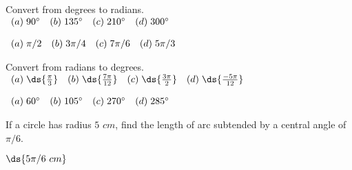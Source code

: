 \begin{enumialphparenastyle}


\begin{multicols}{2}
\begin{ex}
Convert from degrees to radians.\\
$\begin{array}{cccc}
(a) \hspace{1mm} 90^{\circ} & (b) \hspace{1mm} 135^{\circ} & (c) \hspace{1mm} 210^{\circ} & (d) \hspace{1mm} 300^{\circ} 
\end{array}$  
\begin{sol}
$\begin{array}{cccc}
	(a) \hspace{1mm} \pi/2 & (b) \hspace{1mm} 3\pi/4 & (c) \hspace{1mm} 7\pi/6 & (d) \hspace{1mm} 5\pi/3 
\end{array}$  
\end{sol}
\end{ex}

\begin{ex}
	Convert from radians to degrees.\\
	$\begin{array}{cccc}
	(a) \hspace{1mm} \ds{\frac{\pi}{3}} & (b) \hspace{1mm} \ds{\frac{7\pi}{12}} & (c) \hspace{1mm} \ds{\frac{3\pi}{2}} & (d) \hspace{1mm} \ds{\frac{-5\pi}{12}} 
	\end{array}$  
\begin{sol}
	$\begin{array}{cccc}
	(a) \hspace{1mm} 60^{\circ} & (b) \hspace{1mm} 105^{\circ} & (c) \hspace{1mm} 270^{\circ} & (d) \hspace{1mm} 285^{\circ} 
	\end{array}$   
\end{sol}
\end{ex}

\begin{ex}
	If a circle has radius $5 \,\, cm$, find the length of arc subtended by a central angle of $\pi /6$.
\end{ex}
\begin{sol} 
	$\ds{5\pi/6 \,\, cm}$
\end{sol}


\end{multicols}
\end{enumialphparenastyle}
